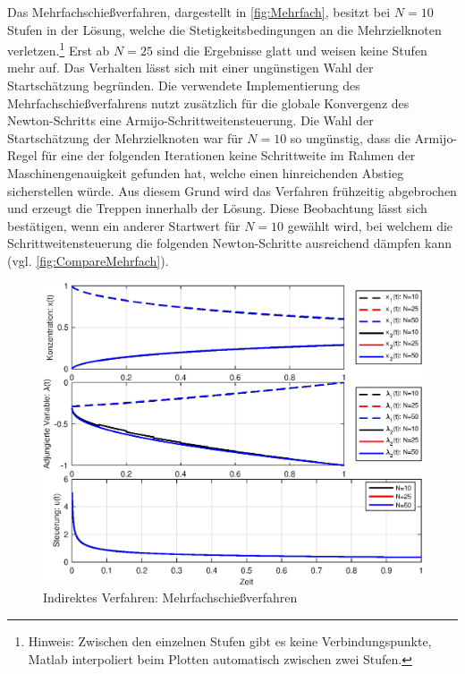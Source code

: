 Das Mehrfachschießverfahren, dargestellt in \autoref{fig:Mehrfach}, besitzt bei $N=10$ Stufen in der Lösung, welche die Stetigkeitsbedingungen an die Mehrzielknoten verletzen.\footnote{Hinweis: Zwischen den einzelnen Stufen gibt es keine Verbindungspunkte, Matlab interpoliert beim Plotten automatisch zwischen zwei Stufen.} Erst ab $N=25$ sind die Ergebnisse glatt und weisen keine Stufen mehr auf. Das Verhalten lässt sich mit einer ungünstigen Wahl der Startschätzung begründen. Die verwendete Implementierung des Mehrfachschießverfahrens nutzt zusätzlich für die globale Konvergenz des Newton-Schritts eine Armijo-Schrittweitensteuerung. Die Wahl der Startschätzung der Mehrzielknoten war für $N=10$ so ungünstig, dass die Armijo-Regel für eine der folgenden Iterationen keine Schrittweite im Rahmen der Maschinengenauigkeit gefunden hat, welche einen hinreichenden Abstieg sicherstellen würde. Aus diesem Grund wird das Verfahren frühzeitig abgebrochen und erzeugt die Treppen innerhalb der Lösung. Diese Beobachtung lässt sich bestätigen, wenn ein anderer Startwert für $N=10$ gewählt wird, bei welchem die Schrittweitensteuerung die folgenden Newton-Schritte ausreichend dämpfen kann (vgl. \autoref{fig:CompareMehrfach}). 

\begin{figure}[h!]
	\centering
	\includegraphics[width=.75\textwidth]{images/MultipleShoot_Result}
	\caption{Indirektes Verfahren: Mehrfachschießverfahren}
	\label{fig:Mehrfach}
\end{figure}


